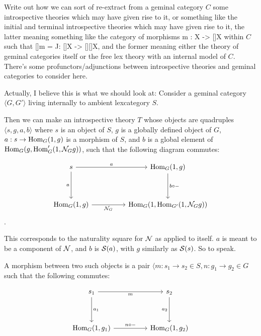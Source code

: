 \documentclass[./main.tex]{subfiles}
\begin{document}
\begin{TODOblock}
Write out how we can sort of re-extract from a geminal category $C$ some introspective theories which may have given rise to it, or something like the initial and terminal introspective theories which may have given rise to it, the latter meaning something like the category of morphisms m : X -> []X within $C$ such that []m = J: []X -> [][]X, and the former meaning either the theory of geminal categories itself or the free lex theory with an internal model of $C$. There's some profunctors/adjunctions between introspective theories and geminal categories to consider here.

Actually, I believe this is what we should look at: Consider a geminal category $\langle G, G'\rangle$ living internally to ambient lexcategory $S$.

Then we can make an introspective theory $T$ whose objects are quadruples $\langle s, g, a, b \rangle$ where $s$ is an object of $S$, $g$ is a globally defined object of $G$, $a : s \to \operatorname{Hom}_G(1, g)$ is a morphism of $S$, and $b$ is a global element of $\operatorname{Hom}_G(g, \operatorname{Hom}_G'(1, \mathcal{N}_G g))$, such that the following diagram commutes:

\[\begin{tikzcd}
	s && {\Hom_G(1, g)} \\
	\\
	{\Hom_G(1, g)} && {\Hom_G(1, \Hom_{G'}(1, \introN_G g))}
	\arrow["a"', from=1-1, to=3-1]
	\arrow["a", from=1-1, to=1-3]
	\arrow["{b \circ -}", from=1-3, to=3-3]
	\arrow["{\introN_G}"', from=3-1, to=3-3]
\end{tikzcd}\].

This corresponds to the naturality square for $\mathcal{N}$ as applied to itself. $a$ is meant to be a component of $\mathcal{N}$, and $b$ is $\mathcal{S}(a)$, with $g$ similarly as $\mathcal{S}(s)$. So to speak.

A morphism between two such objects is a pair $\langle m : s_1 \to s_2 \in S, n : g_1 \to g_2 \in G$ such that the following commutes:

\[\begin{tikzcd}
	{s_1} && {s_2} \\
	\\
	{\Hom_G(1, g_1)} && {\Hom_G(1, g_2)}
	\arrow["{a_1}", from=1-1, to=3-1]
	\arrow["m"', from=1-1, to=1-3]
	\arrow["{a_2}"', from=1-3, to=3-3]
	\arrow["{n \circ -}", from=3-1, to=3-3]
\end{tikzcd}\]


\end{TODOblock}
\end{document}
